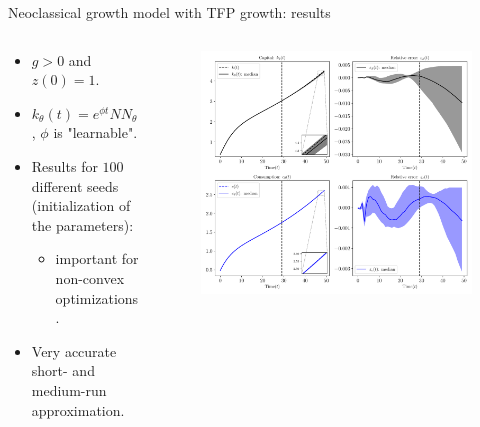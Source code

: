 \documentclass[aspectratio=169,10pt]{beamer}
\begin{document}
\begin{frame}{Neoclassical growth model with TFP growth: results}
	\begin{columns}
		\begin{column}{0.5\textwidth}
			\begin{itemize}
				\item $g>0$ and $z(0) = 1$.
				\vspace{0.05in}
				\item $k_\theta(t) = e^{\phi t}
				NN_\theta(t)$, $\phi$ is "learnable".
				\vspace{0.05in}
				\item Results for $100$ different seeds (initialization of the parameters):
				\begin{itemize}
					\item important for non-convex optimizations.
				\end{itemize} 
				\vspace{0.05in}
				\item Very accurate short- and medium-run approximation.
			\end{itemize}
		\end{column}
		\begin{column}{0.5\textwidth}
			\begin{figure}[t!]
				\centering
				\includegraphics[width=\textwidth]{figs/growth_sequential_g_positive_ensemble.pdf}
				\vspace{-7mm}
			\end{figure}
		\end{column}
	\end{columns}
\end{frame}
\end{document}
